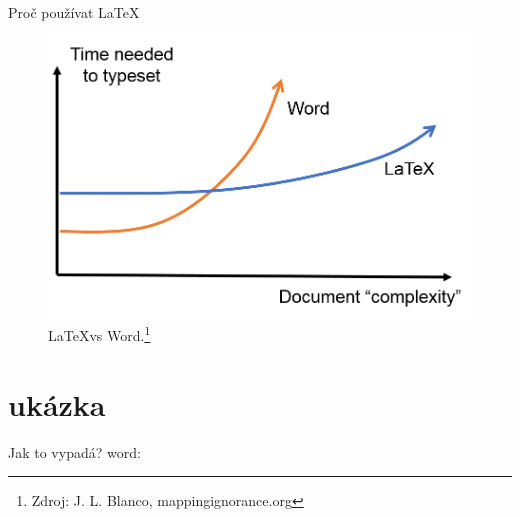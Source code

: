 \documentclass{beamer}
\begin{document}
\begin{frame}{Proč používat \LaTeX}
\begin{figure}
      \centering
      \includegraphics[width=.7\textwidth]{pic/word_vs_latex_1_eng.png}
      \caption{\LaTeX vs Word.\footnote{Zdroj: J. L. Blanco, mappingignorance.org} }
      \label{fig:my_label}
  \end{figure}{}
\end{frame}


\section{ukázka}
\begin{frame}{Jak to vypadá?}
word:
\end{frame}{}
\end{document}
